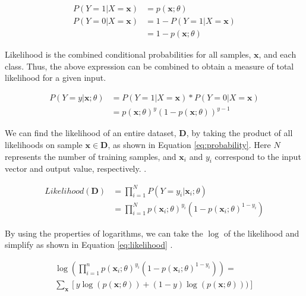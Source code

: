 \documentclass[letterpaper]{article} %
\begin{document}
\begin{align*}
P(Y = 1 | X = \mathbf{x}) &= p(\mathbf{x};\theta) \\
P(Y = 0 | X = \mathbf{x}) &= 1 - P(Y = 1 | X = \mathbf{x}) \\
                          &= 1 - p(\mathbf{x};\theta)
\end{align*}

Likelihood is the combined conditional probabilities for all samples, $\mathbf{x}$,
and each class.
Thus, the above expression can be combined to obtain a measure of total likelihood
for a given input.

\begin{align*}
P(Y=y|\mathbf{x};\theta) &= P(Y = 1 | X = \mathbf{x}) * P(Y = 0 | X = \mathbf{x}) \\
&= p(\mathbf{x};\theta)^y(1-p(\mathbf{x};\theta))^{y - 1}
\end{align*}

We can find the likelihood of an entire dataset, $\mathbf{D}$,
by taking the product of all likelihoods on sample $\mathbf{x} \in \mathbf{D}$,
as shown in Equation \ref{eq:probability}.
Here $N$ represents the number of training samples,
and $\mathbf{x}_i$ and $y_i$ correspond to the input vector and output value,
respectively.
\cite{data_analysis}.

\begin{equation}
\begin{split}
\label{eq:probability}
Likelihood(\mathbf{D}) &= \prod_{i=1}^{N}P(Y=y_i|\mathbf{x}_i;\theta) \\
&= \prod_{i=1}^{N}p(\mathbf{x}_i;\theta)^{y_i}(1 - p(\mathbf{x}_i;\theta)^{1 - y_i})
\end{split}
\end{equation}

By using the properties of logarithms,
we can take the $\log$ of the likelihood and simplify as
shown in Equation \ref{eq:likelihood} \cite{data_analysis}.

\begin{equation}
\begin{split}
\label{eq:likelihood}
\log(\prod_{i = 1}^{n}p(\mathbf{x}_i;\theta)^{y_i}(1 - p(\mathbf{x}_i;\theta)^{1 - y_i})) = \\
\sum_{\mathbf{x}}[y\log(p(\mathbf{x};\theta)) + (1 - y)\log(p(\mathbf{x};\theta)))]%
\end{split}
\end{equation}
\end{document}
